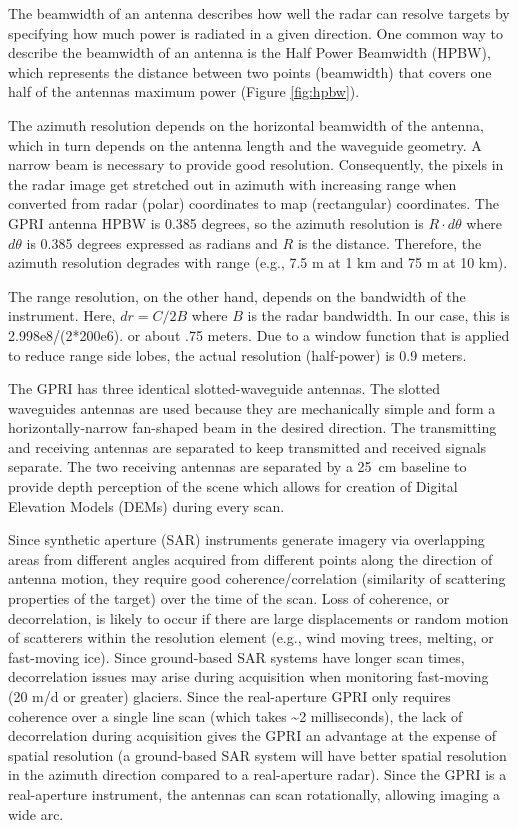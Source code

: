 The beamwidth of an antenna describes how well the radar can resolve targets by specifying how much power is radiated in a given direction.  One common way to describe the beamwidth of an antenna is the Half Power Beamwidth (HPBW), which represents the distance between two points (beamwidth) that covers one half of the antennas maximum power (Figure \ref{fig:hpbw}).

The azimuth resolution depends on the horizontal beamwidth of the antenna, which in turn depends on the antenna length and the waveguide geometry. A narrow beam is necessary to provide good resolution. Consequently, the pixels in the radar image get stretched out in azimuth with increasing range when converted from radar (polar) coordinates to map (rectangular) coordinates. The GPRI antenna HPBW is 0.385 degrees, so the azimuth resolution is $R \cdot d\theta$ where $d\theta$ is 0.385 degrees expressed as radians and $R$ is the distance. Therefore, the azimuth resolution degrades with range (e.g., 7.5 m at 1 km and 75 m at 10 km). 

The range resolution, on the other hand, depends on the bandwidth of the instrument. Here,  $dr = C/2B$  where $B$ is the radar bandwidth. In our case, this is 2.998e8/(2*200e6). or about .75 meters. Due to a window function that is applied to reduce range side lobes, the actual resolution (half-power) is 0.9 meters.

The GPRI has three identical slotted-waveguide antennas. The slotted waveguides antennas are used because they are mechanically simple and form a horizontally-narrow fan-shaped beam in the desired direction. The transmitting and receiving antennas are separated to keep transmitted and received signals separate. The two receiving antennas are separated by a 25~cm baseline to provide depth perception of the scene which allows for creation of Digital Elevation Models (DEMs) during every scan.


Since synthetic aperture (SAR) instruments generate imagery via overlapping areas from different angles acquired from different points along the direction of antenna motion, they require good coherence/correlation (similarity of scattering properties of the target) over the time of the scan. Loss of coherence, or decorrelation, is likely to occur if there are large displacements or random motion of scatterers within the resolution element (e.g., wind moving trees,  melting, or fast-moving ice).  Since ground-based SAR systems have longer scan times, decorrelation issues may arise during acquisition when monitoring fast-moving (20 m/d or greater) glaciers. Since the real-aperture GPRI only requires coherence over a single line scan (which takes \textasciitilde2 milliseconds), the lack of  decorrelation during acquisition gives the GPRI an advantage at the expense of spatial resolution (a ground-based SAR system will have better spatial resolution in the azimuth direction compared to a real-aperture radar). Since the GPRI is a real-aperture instrument, the antennas can scan rotationally, allowing imaging a wide arc.


